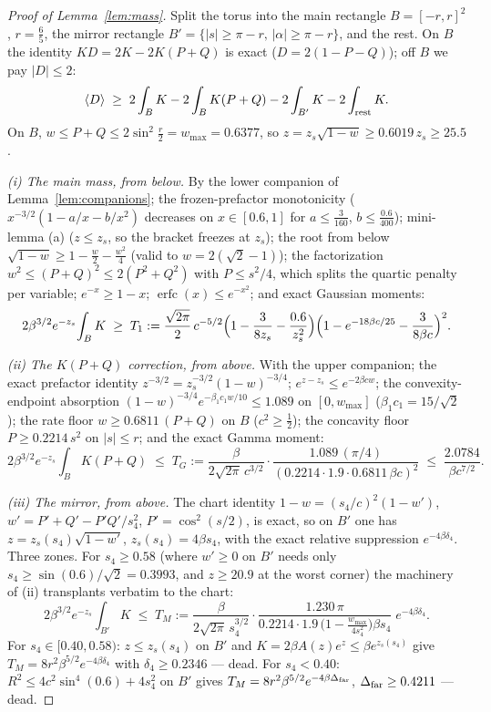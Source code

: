 \documentclass[11pt]{article}
\theoremstyle{remark}
\begin{document}
\begin{proof}[Proof of Lemma~\ref{lem:mass}]
Split the torus into the main rectangle $B=[-r,r]^2$, $r=\tfrac65$,
the mirror rectangle $B'=\{|s|\ge\pi-r,\,|\alpha|\ge\pi-r\}$, and
the rest. On $B$ the identity $KD=2K-2K(P+Q)$ is exact
\textup{(}$D=2(1-P-Q)$\textup{)}; off $B$ we pay $|D|\le2$:
\[
\langle D\rangle\;\ge\;2\int_BK-2\int_BK(P+Q)-2\int_{B'}K
-2\int_{\rm rest}K .
\]
On $B$, $w\le P+Q\le2\sin^2\tfrac r2=w_{\max}=0.6377$, so
$z=z_s\sqrt{1-w}\ge0.6019\,z_s\ge25.5$.

\emph{(i) The main mass, from below.} By the lower companion of
Lemma~\ref{lem:companions}; the frozen-prefactor monotonicity
\textup{(}$x^{-3/2}(1-a/x-b/x^2)$ decreases on $x\in[0.6,1]$ for
$a\le\tfrac3{160}$, $b\le\tfrac{0.6}{400}$\textup{)}; mini-lemma
\textup{(a)} \textup{(}$z\le z_s$, so the bracket freezes at
$z_s$\textup{)}; the root from below
$\sqrt{1-w}\ge1-\tfrac w2-\tfrac{w^2}4$ \textup{(}valid to
$w=2(\sqrt2-1)$\textup{)}; the factorization
$w^2\le(P+Q)^2\le2(P^2+Q^2)$ with $P\le s^2/4$, which splits the
quartic penalty per variable; $e^{-x}\ge1-x$;
$\operatorname{erfc}(x)\le e^{-x^2}$; and exact Gaussian moments:
\[
2\beta^{3/2}e^{-z_s}\!\int_BK\;\ge\;
T_1:=\frac{\sqrt{2\pi}}{2}\,c^{-5/2}
\Bigl(1-\frac{3}{8z_s}-\frac{0.6}{z_s^{2}}\Bigr)
\Bigl(1-e^{-18\beta c/25}-\frac{3}{8\beta c}\Bigr)^{2}.
\]

\emph{(ii) The $K(P+Q)$ correction, from above.} With the upper
companion; the exact prefactor identity
$z^{-3/2}=z_s^{-3/2}(1-w)^{-3/4}$; $e^{z-z_s}\le e^{-2\beta cw}$;
the convexity-endpoint absorption
$(1-w)^{-3/4}e^{-\beta_1c_1w/10}\le1.089$ on $[0,w_{\max}]$
\textup{(}$\beta_1c_1=15/\sqrt2$\textup{)}; the rate floor
$w\ge0.6811\,(P+Q)$ on $B$ \textup{(}$c^2\ge\tfrac12$\textup{)};
the concavity floor $P\ge0.2214\,s^2$ on $|s|\le r$; and the exact
Gamma moment:
\[
2\beta^{3/2}e^{-z_s}\!\int_BK(P+Q)\;\le\;
T_G:=\frac{\beta}{2\sqrt{2\pi}\,c^{3/2}}\cdot
\frac{1.089\,(\pi/4)}{(0.2214\cdot1.9\cdot0.6811\,\beta c)^{2}}
\;\le\;\frac{2.0784}{\beta c^{7/2}} .
\]

\emph{(iii) The mirror, from above.} The chart identity
$1-w=(s_4/c)^2(1-w')$, $w'=P'+Q'-P'Q'/s_4^{2}$,
$P'=\cos^2(s/2)$, is exact, so on $B'$ one has
$z=z_s(s_4)\sqrt{1-w'}$, $z_s(s_4)=4\beta s_4$, with the exact
relative suppression $e^{-4\beta\delta_4}$. Three zones. For
$s_4\ge0.58$ \textup{(}where $w'\ge0$ on $B'$ needs only
$s_4\ge\sin(0.6)/\sqrt2=0.3993$, and $z\ge20.9$ at the worst
corner\textup{)} the machinery of \textup{(ii)} transplants
verbatim to the chart:
\[
2\beta^{3/2}e^{-z_s}\!\int_{B'}K\;\le\;
T_M:=\frac{\beta}{2\sqrt{2\pi}\,s_4^{3/2}}\cdot
\frac{1.230\,\pi}
{0.2214\cdot1.9\,\bigl(1-\tfrac{w_{\max}}{4s_4^{2}}\bigr)\beta s_4}
\;e^{-4\beta\delta_4}.
\]
For $s_4\in[0.40,0.58)$: $z\le z_s(s_4)$ on $B'$ and
$K=2\beta A(z)e^{z}\le\beta e^{z_s(s_4)}$ give
$T_M=8r^2\beta^{5/2}e^{-4\beta\delta_4}$ with $\delta_4\ge0.2346$
--- dead. For $s_4<0.40$:
$R^2\le4c^2\sin^4(0.6)+4s_4^{2}$ on $B'$ gives
$T_M=8r^2\beta^{5/2}e^{-4\beta\Delta_{\rm far}}$,
$\Delta_{\rm far}\ge0.4211$ --- dead.


\end{proof}
\end{document}
